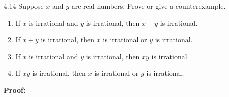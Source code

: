 \begin{enumerate}
\begin{enumerate}
					Since the sum and product of integers are also integers we have
					that $x + y$ is also a rational number. \qed
			\item	Let $x$ and $y$ be rational numbers. Then there exist integers
					$p$ and $r$ and nonzero integers $q$ and $s$ such that $x = p/q$
					and $y = r/s$. Then it follows that $xy = pr/qs$. Since the
					product of integers is also an integer we have that $xy$ is also
					a rational number. \qed
			\item	Let $x$ be a rational number and let $y$ be an irrational number.
					Then we can write $x = p/q$ for some integer $p$ and nonzero
					integer $q$. Assume by way of contradiction that $x + y$ is
					rational; hence $x + y = r/s$ for some integers $r$ and $s$, with
					$s \neq 0$. Thus we have that $y = (r/s) + (-x)$. By (b) it
					follows that $y$ is a rational number, a contradiction. Thus
					$x + y$ must be irrational. \qed
      \end{enumerate} 
   \item[4.14] Suppose $x$ and $y$ are real numbers. Prove or give a 
               counterexample.
               \begin{enumerate}
                  \item If $x$ is irrational and $y$ is irrational, then $x + y$
                        is irrational.
                  \item If $x + y$ is irrational, then $x$ is irrational or
                        $y$ is irrational.
                  \item If $x$ is irrational and $y$ is irrational, then $xy$
                        is irrational.
                  \item If $xy$ is irrational, then $x$ is irrational or $y$ is
                        irrational.
               \end{enumerate}
					
		\textbf{Proof:}
		

\end{enumerate}
